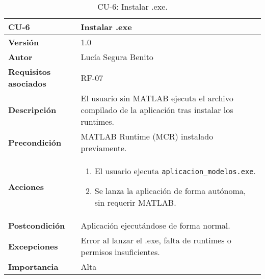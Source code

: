 \begin{table}[H]
\centering
\begin{tabular}{|p{3cm}|p{9cm}|}
\hline
\textbf{CU-6} & \textbf{Instalar .exe} \\
\hline
\textbf{Versión} & 1.0 \\
\hline
\textbf{Autor} & Lucía Segura Benito \\
\hline
\textbf{Requisitos asociados} & RF-07 \\
\hline
\textbf{Descripción} & El usuario sin MATLAB ejecuta el archivo compilado de la aplicación tras instalar los runtimes. \\
\hline
\textbf{Precondición} & MATLAB Runtime (MCR) instalado previamente. \\
\hline
\textbf{Acciones} &
\begin{enumerate}
    \item El usuario ejecuta \texttt{aplicacion\_modelos.exe}.
    \item Se lanza la aplicación de forma autónoma, sin requerir MATLAB.
\end{enumerate}
\\
\hline
\textbf{Postcondición} & Aplicación ejecutándose de forma normal. \\
\hline
\textbf{Excepciones} & Error al lanzar el .exe, falta de runtimes o permisos insuficientes. \\
\hline
\textbf{Importancia} & Alta \\
\hline
\end{tabular}
\caption{CU-6: Instalar .exe.}
\label{tab:cu6}
\end{table}
